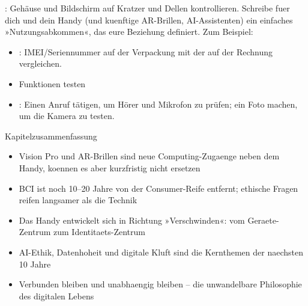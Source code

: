 \begin{tcbpractice}{: Gehäuse und Bildschirm auf Kratzer und Dellen kontrollieren.}
Schreibe fuer dich und dein Handy (und kuenftige AR-Brillen, AI-Assistenten) ein einfaches »Nutzungsabkommen«, das eure Beziehung definiert. Zum Beispiel:

\begin{itemize}
  \item : IMEI/Seriennummer auf der Verpackung mit der auf der Rechnung vergleichen.
  \item Funktionen testen
  \item : Einen Anruf tätigen, um Hörer und Mikrofon zu prüfen; ein Foto machen, um die Kamera zu testen.
\end{itemize}

\end{tcbpractice}

\begin{tcbsummary}{Kapitelzusammenfassung}
\begin{itemize}
  \item Vision Pro und AR-Brillen sind neue Computing-Zugaenge neben dem Handy, koennen es aber kurzfristig nicht ersetzen
  \item BCI ist noch 10–20 Jahre von der Consumer-Reife entfernt; ethische Fragen reifen langsamer als die Technik
  \item Das Handy entwickelt sich in Richtung »Verschwinden«: vom Geraete-Zentrum zum Identitaets-Zentrum
  \item AI-Ethik, Datenhoheit und digitale Kluft sind die Kernthemen der naechsten 10 Jahre
  \item Verbunden bleiben und unabhaengig bleiben – die unwandelbare Philosophie des digitalen Lebens
\end{itemize}

\end{tcbsummary}
